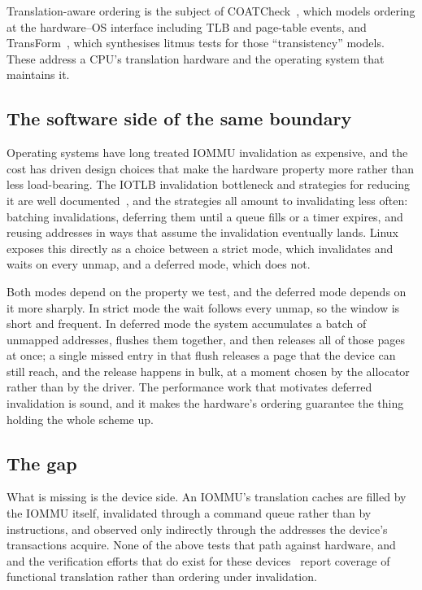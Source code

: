 \documentclass[journal]{IEEEtran}
\begin{document}
Translation-aware ordering is the subject of COATCheck~\cite{coatcheck}, which
models ordering at the hardware--OS interface including TLB and page-table
events, and TransForm~\cite{transform}, which synthesises litmus tests for those
``transistency'' models. These address a CPU's translation hardware and the
operating system that maintains it.

\subsection{The software side of the same boundary}
Operating systems have long treated IOMMU invalidation as expensive, and the
cost has driven design choices that make the hardware property more rather than
less load-bearing. The IOTLB invalidation bottleneck and strategies for reducing
it are well documented~\cite{iotlb}, and the strategies all amount to
invalidating less often: batching invalidations, deferring them until a queue
fills or a timer expires, and reusing addresses in ways that assume the
invalidation eventually lands. Linux exposes this directly as a choice between
a strict mode, which invalidates and waits on every unmap, and a deferred mode,
which does not.

Both modes depend on the property we test, and the deferred mode depends on it
more sharply. In strict mode the wait follows every unmap, so the window is
short and frequent. In deferred mode the system accumulates a batch of unmapped
addresses, flushes them together, and then releases all of those pages at once;
a single missed entry in that flush releases a page that the device can still
reach, and the release happens in bulk, at a moment chosen by the allocator
rather than by the driver. The performance work that motivates deferred
invalidation is sound, and it makes the hardware's ordering guarantee the thing
holding the whole scheme up.

\subsection{The gap}
What is missing is the device side. An IOMMU's translation caches are filled by
the IOMMU itself, invalidated through a command queue rather than by
instructions, and observed only indirectly through the addresses the device's
transactions acquire. None of the above tests that path against hardware, and
and the verification efforts that do exist for these devices~\cite{zdl10x,elbrus}
report coverage of functional translation rather than ordering under
invalidation.
\end{document}
